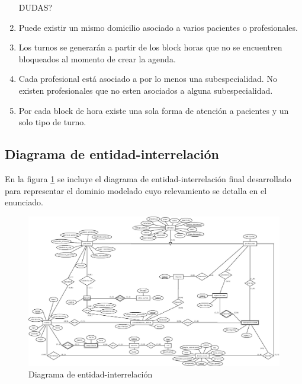 \documentclass[a4paper,11pt]{article}
\begin{document}
\begin{enumerate}
DUDAS?
\item Puede existir un mismo domicilio asociado a varios pacientes o profesionales.

\item Los turnos se generarán a partir de los block horas que no se encuentren 
bloqueados al momento de crear la agenda.

\item Cada profesional está asociado a por lo menos una subespecialidad. No existen 
profesionales que no esten asociados a alguna subespecialidad.

\item Por cada block de hora existe una sola forma de atención a pacientes y un 
solo tipo de turno.

\end{enumerate}



\subsection{Diagrama de entidad-interrelación}

 En la figura \ref{fig:der} se incluye el diagrama de entidad-interrelación
 final desarrollado para representar el dominio modelado cuyo relevamiento se
 detalla en el enunciado.

\begin{figure}[h!t]
  \centering
  \includegraphics[width=1.4\textwidth, angle=90]{build/images/der.jpeg}
  \caption{Diagrama de entidad-interrelación} \label{fig:der}
\end{figure}

\FloatBarrier
\end{document}
